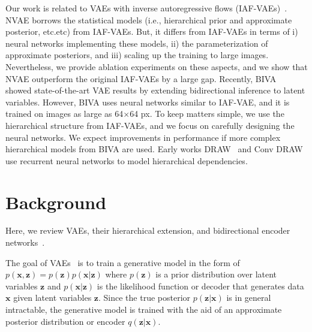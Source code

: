 \documentclass{article}
\newcommand{\x}{{\pmb{x}}}
\newcommand{\z}{{\pmb{z}}}
\begin{document}
Our work is related to VAEs with inverse autoregressive flows (IAF-VAEs)~\cite{kingma2016improved}. NVAE borrows the statistical models (i.e., hierarchical prior and approximate posterior, etc.etc) from IAF-VAEs. But, it differs from IAF-VAEs in terms of i) neural networks implementing these models, ii) the parameterization of approximate posteriors, and iii) scaling up the training to large images. Nevertheless, we provide ablation experiments on these aspects, and we show that NVAE outperform the original IAF-VAEs by a large gap. Recently, BIVA~\cite{maaloe2019biva} showed state-of-the-art VAE results by extending bidirectional inference to latent variables. However, BIVA uses neural networks similar to IAF-VAE, and it is trained on images as large as 64$\times$64 px. To keep matters simple, we use the hierarchical structure from IAF-VAEs, and we focus on carefully designing the neural networks. We expect improvements in performance if more complex hierarchical models from BIVA are used. Early works DRAW~\cite{gregor2015draw} and Conv DRAW~\cite{gregor2016ConvDraw} use recurrent neural networks to model hierarchical dependencies.
 \vspace{-0.5cm}
\section{Background}\label{sec:bg}
Here, we review VAEs, their hierarchical extension, and bidirectional encoder networks~\cite{kingma2016improved, sonderby2016ladder}.

The goal of VAEs~\cite{kingma2014vae} is to train a generative model in the form of $p(\x, \z) = p(\z) p(\x|\z)$ where $p(\z)$ is a prior distribution over latent variables $\z$ and $p(\x |\z)$ is the likelihood function or decoder that generates data $\x$ given latent variables $\z$. Since the true posterior $p(\z|\x)$ is in general intractable, the generative model is trained with the aid of an approximate posterior distribution or encoder $q(\z|\x)$.
\end{document}
